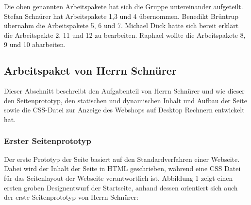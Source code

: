 Die oben genannten Arbeitspakete hat sich die Gruppe untereinander aufgeteilt. Stefan Schnürer hat Arbeitspakete 1,3 und 4 übernommen. Benedikt Brüntrup übernahm die Arbeitspakete 5, 6 und 7. Michael Dück hatte sich bereit erklärt die Arbeitspakte 2, 11 und 12 zu bearbeiten. Raphael wollte die Arbeitspakete 8, 9 und 10 abarbeiten.



\newpage
\subsection{Arbeitspaket von Herrn Schnürer}

Dieser Abschnitt beschreibt den Aufgabenteil von Herrn Schnürer und wie dieser den Seitenprototyp, den statischen und dynamischen Inhalt und Aufbau der Seite sowie die CSS-Datei zur Anzeige des Webshops auf Desktop Rechnern entwickelt hat.

\subsubsection{Erster Seitenprototyp}

Der erste Prototyp der Seite basiert auf den Standardverfahren einer Webseite. Dabei wird der Inhalt der Seite in HTML geschrieben, während eine CSS Datei für das Seitenlayout der Webseite verantwortlich ist. Abbildung 1 zeigt einen ersten groben Designentwurf der Startseite, anhand dessen orientiert sich auch der erste Seitenprototyp von Herrn Schnürer:

